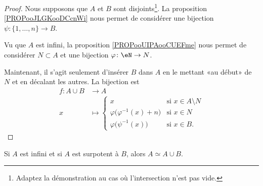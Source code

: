 \begin{proof}
    Nous supposons que \( A\) et \( B\) sont disjoints\footnote{Adaptez la démonstration au cas où l'intersection n'est pas vide.}. La proposition \ref{PROPooJLGKooDCcnWi} nous permet de considérer une bijection \( \psi\colon \{ 1,\ldots, n \}\to B\).
    
    Vu que \( A\) est infini, la proposition \ref{PROPooUIPAooCUEFme} nous permet de considérer \( N\subset A\) et une bijection \( \varphi\colon \eN\to N\).

    Maintenant, il s'agit seulement d'insérer \( B\) dans \( A\) en le mettant «au début» de \( N\) et en décalant les autres. La bijection est
    \begin{equation}
        \begin{aligned}
            f\colon A\cup B&\to A \\
            x&\mapsto \begin{cases}
                x    &   \text{si } x\in A\setminus N\\
                \varphi\big( \varphi^{-1}(x)+n \big)    &   \text{si } x\in N\\
                \varphi\big( \psi^{-1}(x) \big)    &    \text{si }x\in B.
            \end{cases}
        \end{aligned}
    \end{equation}
\end{proof}

\begin{lemma}       \label{LEMooXMVDooIWLWis}
    Si \( A\) est infini et si \( A\) est surpotent à \( B\), alors \( A\simeq A\cup B\).
\end{lemma}

